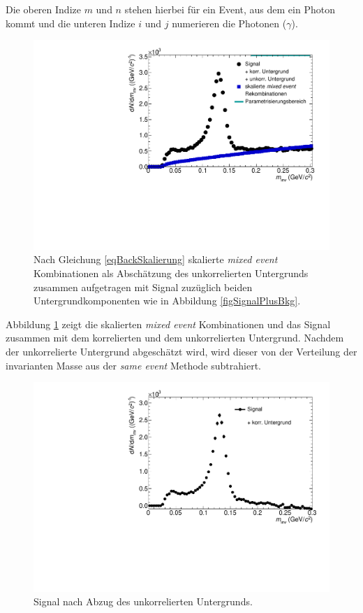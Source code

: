 Die oberen Indize $m$ und $n$ stehen hierbei für ein Event, aus dem ein Photon kommt und die unteren Indize $i$ und $j$ numerieren die Photonen ($\gamma$).
\begin{figure}[tp]
\centering
\includegraphics[width=.75\linewidth]{hUncorrBkgNorm.pdf}
\caption{Nach Gleichung \ref{eqBackSkalierung} skalierte {\it mixed event} Kombinationen als Abschätzung des unkorrelierten Untergrunds zusammen aufgetragen mit Signal zuzüglich beiden Untergrundkomponenten wie in Abbildung \ref{figSignalPlusBkg}.}
\label{figUncorrBkgNorm}
\end{figure}
\newline
Abbildung \ref{figUncorrBkgNorm} zeigt die skalierten \textit{mixed event} Kombinationen und das Signal zusammen mit dem korrelierten und dem unkorrelierten Untergrund.
Nachdem der unkorrelierte Untergrund abgeschätzt wird, wird dieser von der Verteilung der invarianten Masse aus der \textit{same event} Methode subtrahiert.
\begin{figure}[tp]
\centering
\includegraphics[width=.75\linewidth]{hInvMass_Data.pdf}
\caption{Signal nach Abzug des unkorrelierten Untergrunds.}
\label{figInvMass_Data}
\end{figure}
